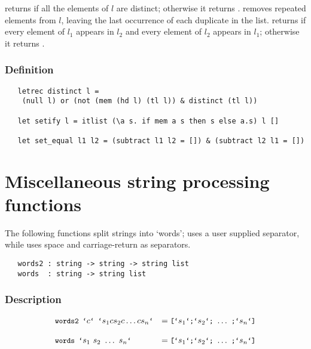  returns  if all the elements of $l$ are distinct;
otherwise it returns .  removes repeated elements
from $l$, leaving the last occurrence of each duplicate in the list.
 returns  if every element of $l_1$
appears in $l_2$ and every element of $l_2$ appears in $l_1$; otherwise it
returns .

\subsubsection*{Definition}

\begin{hol}\begin{verbatim}
   letrec distinct l =
    (null l) or (not (mem (hd l) (tl l)) & distinct (tl l))

   let setify l = itlist (\a s. if mem a s then s else a.s) l []

   let set_equal l1 l2 = (subtract l1 l2 = []) & (subtract l2 l1 = [])
\end{verbatim}\end{hol}


\section{Miscellaneous string processing functions}

The following functions split strings into `words'; 
 uses a user supplied separator, while  uses space and
carriage-return as separators.

\begin{boxed}
\begin{verbatim}
   words2 : string -> string -> string list
   words  : string -> string list
\end{verbatim}\end{boxed}

\subsubsection*{Description}

\[ \begin{array}{ll}
\ml{words2\ `}c\ml{`\ `}s_1 c s_2 c \ldots c s_n\ml{`} &=
\ml{[`}s_1\ml{`;`}s_2\ml{`;}\ \ldots\ \ml{;`}s_n\ml{`]}\\
 & \\
\ml{words\ `}s_1\ s_2\ \ldots\ s_n\ml{`} &=
\ml{[`}s_1\ml{`;`}s_2\ml{`;}\ \ldots\ \ml{;`}s_n\ml{`]}\\
\end{array} \]


